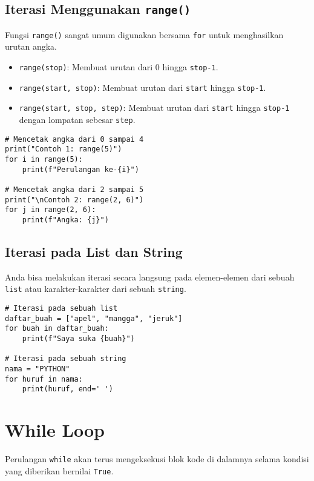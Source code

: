 \subsection{Iterasi Menggunakan \texttt{range()}}
Fungsi \texttt{range()} sangat umum digunakan bersama \texttt{for} untuk menghasilkan urutan angka.
\begin{itemize}
    \item \texttt{range(stop)}: Membuat urutan dari 0 hingga \texttt{stop-1}.
    \item \texttt{range(start, stop)}: Membuat urutan dari \texttt{start} hingga \texttt{stop-1}.
    \item \texttt{range(start, stop, step)}: Membuat urutan dari \texttt{start} hingga \texttt{stop-1} dengan lompatan sebesar \texttt{step}.
\end{itemize}

\begin{lstlisting}[style=PythonStyle, caption={Kode Python: for_with_range.py}]
# Mencetak angka dari 0 sampai 4
print("Contoh 1: range(5)")
for i in range(5):
    print(f"Perulangan ke-{i}")

# Mencetak angka dari 2 sampai 5
print("\nContoh 2: range(2, 6)")
for j in range(2, 6):
    print(f"Angka: {j}")
\end{lstlisting}

\subsection{Iterasi pada List dan String}
Anda bisa melakukan iterasi secara langsung pada elemen-elemen dari sebuah \texttt{list} atau karakter-karakter dari sebuah \texttt{string}.

\begin{lstlisting}[style=PythonStyle, caption={Kode Python: list_and_string_iteration.py}]
# Iterasi pada sebuah list
daftar_buah = ["apel", "mangga", "jeruk"]
for buah in daftar_buah:
    print(f"Saya suka {buah}")

# Iterasi pada sebuah string
nama = "PYTHON"
for huruf in nama:
    print(huruf, end=' ')
\end{lstlisting}

\section{While Loop}
Perulangan \texttt{while} akan terus mengeksekusi blok kode di dalamnya selama kondisi yang diberikan bernilai \texttt{True}.

